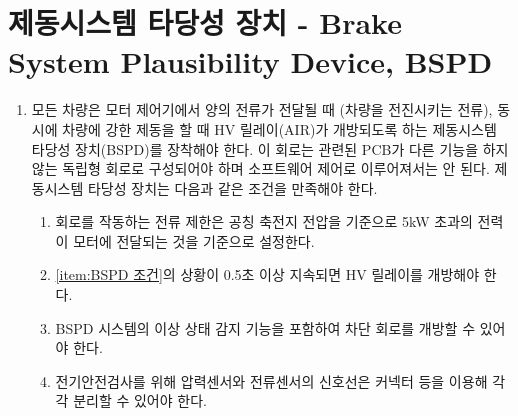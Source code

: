 \documentclass[final,a4paper,10pt]{report}
\begin{document}
\section{제동시스템 타당성 장치 - Brake System Plausibility Device, BSPD}\label{rule:formula-technical.brake-system-plausibility-device}
\begin{enumerate}
  \item\label{rule:formula-technical.brake-system-plausibility-device.hardware-circuit} 모든 차량은 모터 제어기에서 양의 전류가 전달될 때 (차량을 전진시키는 전류), 동시에 차량에 강한 제동을 할 때 HV 릴레이(AIR)가 개방되도록 하는 제동시스템 타당성 장치(BSPD)를 장착해야 한다. 이 회로는 관련된 PCB가 다른 기능을 하지 않는 독립형 회로로 구성되어야 하며 소프트웨어 제어로 이루어져서는 안 된다. 제동시스템 타당성 장치는 다음과 같은 조건을 만족해야 한다. \label{item:BSPD 조건}
    \begin{enumerate}
      \item\label{rule:formula-technical.brake-system-plausibility-device.hardware-circuit.trigger-threshold-5kw} 회로를 작동하는 전류 제한은 공칭 축전지 전압을 기준으로 5kW 초과의 전력이 모터에 전달되는 것을 기준으로 설정한다.
      \item\label{rule:formula-technical.brake-system-plausibility-device.hardware-circuit.min-trip-delay} \ref{item:BSPD 조건}의 상황이 0.5초 이상 지속되면 HV 릴레이를 개방해야 한다.
      \item\label{rule:formula-technical.brake-system-plausibility-device.hardware-circuit.fault-detection-opens-sdc} BSPD 시스템의 이상 상태 감지 기능을 포함하여 차단 회로를 개방할 수 있어야 한다.
      \item\label{rule:formula-technical.brake-system-plausibility-device.hardware-circuit.separable-sensor-signal-lines} 전기안전검사를 위해 압력센서와 전류센서의 신호선은 커넥터 등을 이용해 각각 분리할 수 있어야 한다.
    \end{enumerate}


\end{enumerate}
\end{document}
